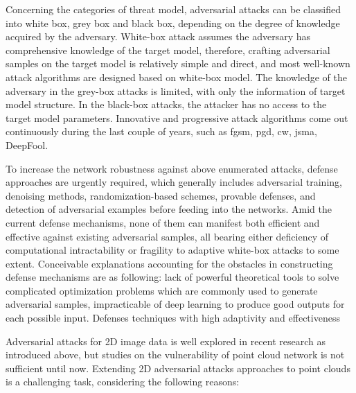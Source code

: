 Concerning the categories of threat model, adversarial attacks can be classified into white box, grey box and black box, depending on the degree of knowledge acquired by the adversary. White-box attack assumes the adversary has comprehensive knowledge of the target model, therefore, crafting adversarial samples on the target model is relatively simple and direct, and most well-known attack algorithms are designed based on white-box model. The knowledge of the adversary in the grey-box attacks is limited, with only the information of target model structure\cite{ferrari_gray-box_2018}. In the black-box attacks, the attacker has no access to the target model parameters\cite{sun_towards_nodate,liu_delving_2017,papernot_practical_2017}.  Innovative and progressive attack algorithms come out continuously during the last couple of years, such as \acrshort{fgsm}\cite{goodfellow_explaining_2015}, \acrshort{pgd}\cite{kurakin_adversarial_2017}, \acrshort{cw}\cite{carlini_towards_2017}, \acrshort{jsma}\cite{papernot_limitations_2015}, DeepFool\cite{moosavi-dezfooli_deepfool_2016}. 

To increase the network robustness against above enumerated attacks, defense approaches are urgently required, which generally includes adversarial training\cite{szegedy_intriguing_2014}, denoising methods\cite{zhou_dup-net_2019,xie_feature_2019,xu_feature_2018}, randomization-based schemes\cite{luo_random_2020,athalye_synthesizing_2018}, provable defenses\cite{raghunathan_certified_2020}, and detection of adversarial examples before feeding into the networks\cite{meng_magnet_2017,liu_detection_2018}. Amid the current defense mechanisms, none of them can manifest both efficient and effective against existing adversarial samples, all bearing either deficiency of computational intractability or fragility to adaptive white-box attacks to some extent. Conceivable explanations accounting for the obstacles in constructing defense mechanisms are as following: lack of powerful theoretical tools to solve complicated optimization problems which are commonly used to generate adversarial samples,  impracticable of deep learning to produce good outputs for each possible input. Defenses techniques with high adaptivity and effectiveness 

Adversarial attacks for 2D image data is well explored in recent research as introduced above\cite{szegedy_intriguing_2014,goodfellow_explaining_2015,moosavi-dezfooli_deepfool_2016,papernot_limitations_2015,carlini_towards_2017}, but studies on the vulnerability of point cloud network is not sufficient until now. Extending 2D adversarial attacks approaches to point clouds is a challenging task, considering the following reasons: 

